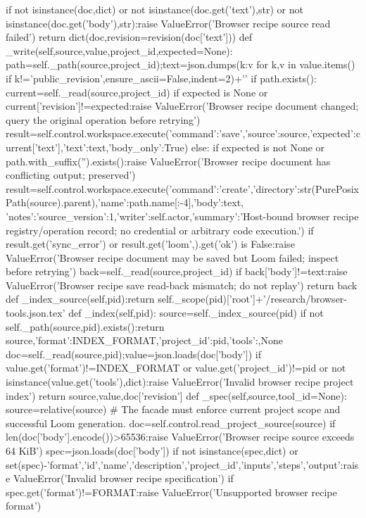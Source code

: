   if not isinstance(doc,dict) or not isinstance(doc.get('text'),str) or not isinstance(doc.get('body'),str):raise ValueError('Browser recipe source read failed')
  return dict(doc,revision=revision(doc['text']))
 def _write(self,source,value,project_id,expected=None):
  path=self._path(source,project_id);text=json.dumps({k:v for k,v in value.items() if k!='public_revision'},ensure_ascii=False,indent=2)+'\n'
  if path.exists():
   current=self._read(source,project_id)
   if expected is None or current['revision']!=expected:raise ValueError('Browser recipe document changed; query the original operation before retrying')
   result=self.control.workspace.execute({'command':'save','source':source,'expected':current['text'],'text':text,'body_only':True})
  else:
   if expected is not None or path.with_suffix('').exists():raise ValueError('Browser recipe document has conflicting output; preserved')
   result=self.control.workspace.execute({'command':'create','directory':str(PurePosixPath(source).parent),'name':path.name[:-4],'body':text,
     'notes':{'source_version':1,'writer':self.actor,'summary':'Host-bound browser recipe registry/operation record; no credential or arbitrary code execution.'}})
  if result.get('sync_error') or result.get('loom',{}).get('ok') is False:raise ValueError('Browser recipe document may be saved but Loom failed; inspect before retrying')
  back=self._read(source,project_id)
  if back['body']!=text:raise ValueError('Browser recipe save read-back mismatch; do not replay')
  return back
 def _index_source(self,pid):return self._scope(pid)['root']+'/research/browser-tools.json.tex'
 def _index(self,pid):
  source=self._index_source(pid)
  if not self._path(source,pid).exists():return source,{'format':INDEX_FORMAT,'project_id':pid,'tools':{}},None
  doc=self._read(source,pid);value=json.loads(doc['body'])
  if value.get('format')!=INDEX_FORMAT or value.get('project_id')!=pid or not isinstance(value.get('tools'),dict):raise ValueError('Invalid browser recipe project index')
  return source,value,doc['revision']
 def _spec(self,source,tool_id=None):
  source=relative(source)
  # The facade must enforce current project scope and successful Loom generation.
  doc=self.control.read_project_source(source)
  if len(doc['body'].encode())>65536:raise ValueError('Browser recipe source exceeds 64 KiB')
  spec=json.loads(doc['body'])
  if not isinstance(spec,dict) or set(spec)-{'format','id','name','description','project_id','inputs','steps','output'}:raise ValueError('Invalid browser recipe specification')
  if spec.get('format')!=FORMAT:raise ValueError('Unsupported browser recipe format')
